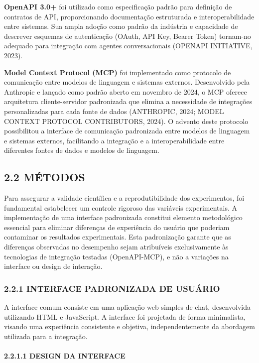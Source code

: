 \documentclass[
]{article}
\begin{document}
\textbf{OpenAPI 3.0+} foi utilizado como especificação padrão para
definição de contratos de API, proporcionando documentação estruturada e
interoperabilidade entre sistemas. Sua ampla adoção como padrão da
indústria e capacidade de descrever esquemas de autenticação (OAuth, API
Key, Bearer Token) tornam-no adequado para integração com agentes
conversacionais (OPENAPI INITIATIVE, 2023).

\textbf{Model Context Protocol (MCP)} foi implementado como protocolo de
comunicação entre modelos de linguagem e sistemas externos. Desenvolvido
pela Anthropic e lançado como padrão aberto em novembro de 2024, o MCP
oferece arquitetura cliente-servidor padronizada que elimina a
necessidade de integrações personalizadas para cada fonte de dados
(ANTHROPIC, 2024; MODEL CONTEXT PROTOCOL CONTRIBUTORS, 2024). O advento
deste protocolo possibilitou a interface de comunicação padronizada
entre modelos de linguagem e sistemas externos, facilitando a integração
e a interoperabilidade entre diferentes fontes de dados e modelos de
linguagem.

\subsection{2.2 MÉTODOS}\label{muxe9todos}

Para assegurar a validade científica e a reprodutibilidade dos
experimentos, foi fundamental estabelecer um controle rigoroso das
variáveis experimentais. A implementação de uma interface padronizada
constitui elemento metodológico essencial para eliminar diferenças de
experiência do usuário que poderiam contaminar os resultados
experimentais. Esta padronização garante que as diferenças observadas no
desempenho sejam atribuíveis exclusivamente às tecnologias de integração
testadas (OpenAPI-MCP), e não a variações na interface ou design de
interação.

\subsubsection{2.2.1 INTERFACE PADRONIZADA DE
USUÁRIO}\label{interface-padronizada-de-usuuxe1rio}

A interface comum consiste em uma aplicação web simples de chat,
desenvolvida utilizando HTML e JavaScript. A interface foi projetada de
forma minimalista, visando uma experiência consistente e objetiva,
independentemente da abordagem utilizada para a integração.

\paragraph{2.2.1.1 DESIGN DA INTERFACE}\label{design-da-interface}
\end{document}
